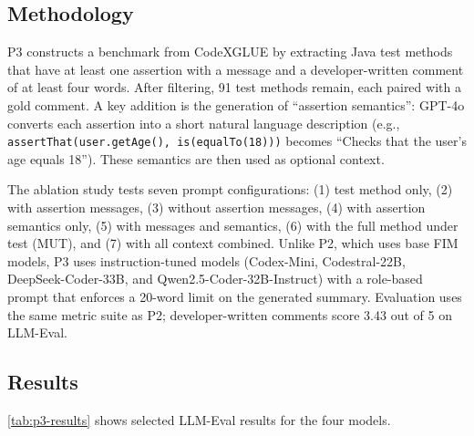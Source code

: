 \documentclass[
    pdftex,
    final,
    11pt,
    a4paper,
    parskip=false,
    oneside,
    footheight=0mm,
    footinclude=false,
    toc=bibliography
]{scrbook}
\begin{document}
\subsection{Methodology}

P3 constructs a benchmark from CodeXGLUE \cite{Lu2021} by extracting Java test methods that have at least one assertion with a message and a developer-written comment of at least four words. After filtering, 91 test methods remain, each paired with a gold comment. A key addition is the generation of ``assertion semantics'': GPT-4o converts each assertion into a short natural language description (e.g., \texttt{assertThat(user.getAge(), is(equalTo(18)))} becomes ``Checks that the user's age equals 18''). These semantics are then used as optional context.

The ablation study tests seven prompt configurations: (1) test method only, (2) with assertion messages, (3) without assertion messages, (4) with assertion semantics only, (5) with messages and semantics, (6) with the full method under test (MUT), and (7) with all context combined. Unlike P2, which uses base FIM models, P3 uses instruction-tuned models (Codex-Mini, Codestral-22B, DeepSeek-Coder-33B, and Qwen2.5-Coder-32B-Instruct) with a role-based prompt that enforces a 20-word limit on the generated summary. Evaluation uses the same metric suite as P2; developer-written comments score 3.43 out of 5 on LLM-Eval.

\subsection{Results}

\autoref{tab:p3-results} shows selected LLM-Eval results for the four models.
\end{document}
